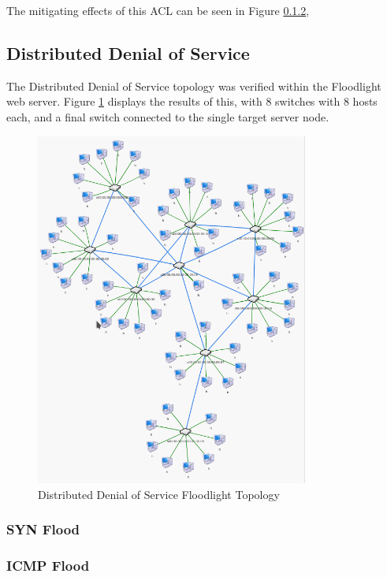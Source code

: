 The mitigating effects of this ACL can be seen in Figure \ref{},

\subsection{Distributed Denial of Service}

The Distributed Denial of Service topology was verified within the Floodlight
web server. Figure \ref{fig:images-flDDoS} displays the results of this, with
8 switches with 8 hosts each, and a final switch connected to the single target
server node.

\begin{figure}[H]
	\centering
	\includegraphics[width=0.8\textwidth]{images/flDDoS}
	\caption{Distributed Denial of Service Floodlight Topology}
	\label{fig:images-flDDoS}
\end{figure}

\subsubsection{SYN Flood}


\subsubsection{ICMP Flood}
